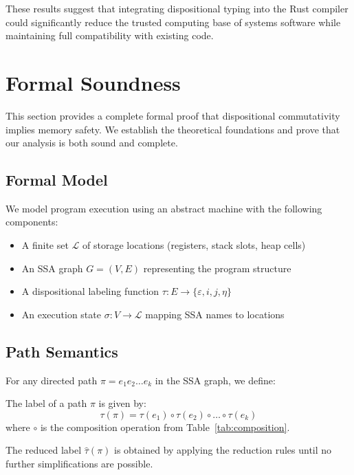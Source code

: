 \documentclass[journal]{IEEEtran}
\begin{document}
These results suggest that integrating dispositional typing into the Rust compiler could significantly reduce the trusted computing base of systems software while maintaining full compatibility with existing code.

\section{Formal Soundness}
\label{sec:soundness}

This section provides a complete formal proof that dispositional commutativity implies memory safety. We establish the theoretical foundations and prove that our analysis is both sound and complete.

\subsection{Formal Model}

We model program execution using an abstract machine with the following components:

\begin{itemize}
\item A finite set $\mathcal{L}$ of storage locations (registers, stack slots, heap cells)
\item An SSA graph $G = (V, E)$ representing the program structure  
\item A dispositional labeling function $\tau: E \to \{\varepsilon, i, j, \eta\}$
\item An execution state $\sigma: V \to \mathcal{L}$ mapping SSA names to locations
\end{itemize}

\subsection{Path Semantics}

For any directed path $\pi = e_1 e_2 \ldots e_k$ in the SSA graph, we define:

\begin{definition}
The label of a path $\pi$ is given by:
\begin{equation}
\tau(\pi) = \tau(e_1) \circ \tau(e_2) \circ \ldots \circ \tau(e_k)
\end{equation}
where $\circ$ is the composition operation from Table~\ref{tab:composition}.
\end{definition}

\begin{definition}  
The reduced label $\hat{\tau}(\pi)$ is obtained by applying the reduction rules until no further simplifications are possible.
\end{definition}
\end{document}
